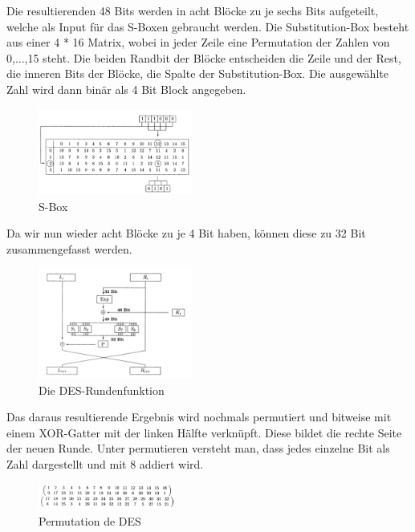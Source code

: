 \documentclass[11pt]{scrartcl}
\begin{document}
\noindent \grqq{}Die resultierenden 48 Bits werden in acht Blöcke zu je sechs Bits aufgeteilt\grqq{}\cite{2}, welche als Input für das S-Boxen gebraucht werden. Die Substitution-Box besteht aus einer 4 * 16 Matrix, \grqq{}wobei in jeder Zeile eine Permutation der Zahlen von 0,...,15 steht.\grqq{}\cite{2} Die beiden Randbit der Blöcke entscheiden die Zeile und der Rest, die inneren Bits der Blöcke, die Spalte der Substitution-Box. Die ausgewählte Zahl wird dann binär als 4 Bit Block angegeben. \cite{2}
\begin{figure}[H]
\includegraphics[width=0.45\textwidth]{Bilder/DES/S-Box}
	\caption{S-Box \cite{2}}
	\label{fig2}
\end{figure}
\noindent Da wir nun wieder acht Blöcke zu je 4 Bit haben, können diese zu 32 Bit zusammengefasst werden. \cite{2}
\begin{figure}[H]
\includegraphics[width=0.45\textwidth]{Bilder/DES/DES_Rundenfunktion}
	\caption{Die DES-Rundenfunktion \cite{2}}
	\label{fig3}
\end{figure}
\noindent Das daraus resultierende Ergebnis wird nochmals permutiert und bitweise mit einem XOR-Gatter mit der linken Hälfte verknüpft. Diese \grqq{}bildet die rechte Seite der neuen Runde.\grqq{}\cite{2} Unter permutieren versteht man, dass jedes einzelne Bit als Zahl dargestellt und mit 8 addiert wird. \cite{2}
\begin{figure}[H]
\includegraphics[width=0.40\textwidth]{Bilder/DES/DES_Permutation}
	\caption{Permutation de DES \cite{2}}
	\label{fig4}
\end{figure}
\noindent 
\end{document}
